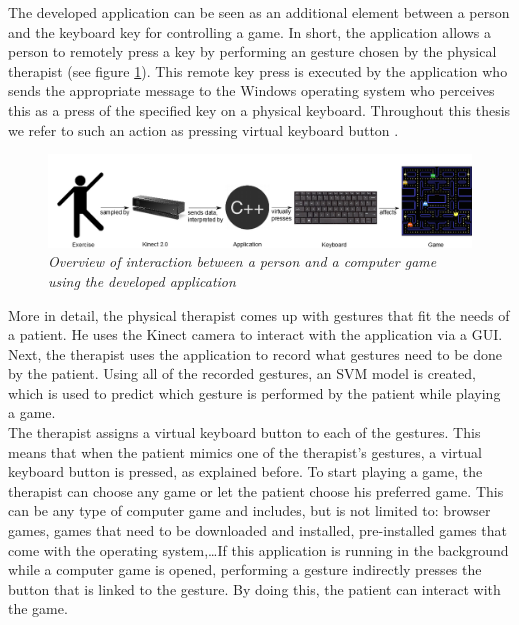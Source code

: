 The developed application can be seen as an additional element between a person and the keyboard key for controlling a game. In short, the application allows a person to remotely press a key by performing an gesture chosen by the physical therapist (see figure \ref{fig: overview_application_interaction}). This remote key press is executed by the application who sends the appropriate message to the Windows operating system who perceives this as a press of the specified key on a physical keyboard. Throughout this thesis we refer to such an action as pressing virtual keyboard button . \\

\begin{figure}[H]
\begin{center}
\includegraphics[width=14cm]{Concept2.png}
\caption{\emph{Overview of interaction between a person and a computer game using the developed application}}
\label{fig: overview_application_interaction}
\end{center}
\end{figure}

More in detail, the physical therapist comes up with gestures that fit the needs of a patient. He uses the Kinect camera to interact with the application via a GUI. Next, the therapist uses the application to record what gestures need to be done by the patient. Using all of the recorded gestures, an SVM model is created, which is used to predict which gesture is performed by the patient while playing a game.\\

The therapist assigns a virtual keyboard button to each of the gestures. This means that when the patient mimics one of the therapist's gestures, a virtual keyboard button is pressed, as explained before. To start playing a game, the therapist can choose any game or let the patient choose his preferred game. This can be any type of computer game and includes, but is not limited to: browser games, games that need to be downloaded and installed, pre-installed games that come with the operating system,\ldots If this application is running in the background while a computer game is opened, performing a gesture indirectly presses the button that is linked to the gesture. By doing this, the patient can interact with the game.\\

